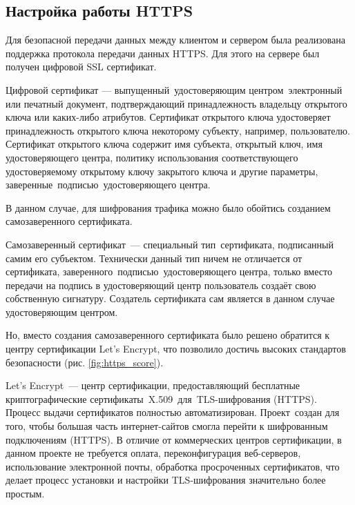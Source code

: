 \clearpage
\subsection{Настройка работы HTTPS}
Для безопасной передачи данных между клиентом и сервером была реализована
поддержка протокола передачи данных HTTPS. Для этого на сервере был получен цифровой SSL сертификат.
\begin{definition}
    Цифровой сертификат --- выпущенный удостоверяющим центром электронный или печатный документ,
    подтверждающий принадлежность владельцу открытого ключа или каких-либо атрибутов.
    Сертификат открытого ключа удостоверяет принадлежность открытого ключа некоторому субъекту, например, пользователю.
    Сертификат открытого ключа содержит имя субъекта, открытый ключ, имя удостоверяющего центра,
    политику использования соответствующего удостоверяемому открытому ключу закрытого ключа и другие параметры, заверенные подписью удостоверяющего центра.
\end{definition}

В данном случае, для шифрования трафика можно было обойтись созданием самозаверенного сертификата.
\begin{definition}
    Самозаверенный сертификат --- специальный тип сертификата, подписанный самим его субъектом. Технически данный тип ничем не отличается от сертификата,
    заверенного подписью удостоверяющего центра, только вместо передачи на подпись в удостоверяющий центр пользователь создаёт свою собственную сигнатуру.
    Создатель сертификата сам является в данном случае удостоверяющим центром.
\end{definition}

Но, вместо создания самозаверенного сертификата было решено обратится к центру сертификации Let’s Encrypt,
что позволило достичь высоких стандартов безопасности (рис. \ref{fig:https_score}).
\begin{definition}
    Let’s Encrypt --- центр сертификации, предоставляющий бесплатные криптографические сертификаты X.509 для TLS-шифрования (HTTPS).
    Процесс выдачи сертификатов полностью автоматизирован. Проект создан для того,
    чтобы большая часть интернет-сайтов смогла перейти к шифрованным подключениям (HTTPS). В отличие от коммерческих центров сертификации,
    в данном проекте не требуется оплата, переконфигурация веб-серверов, использование электронной почты,
    обработка просроченных сертификатов, что делает процесс установки и настройки TLS-шифрования значительно более простым.
\end{definition}

